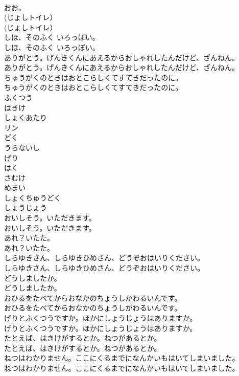 \documentclass[8pt]{extreport}
\begin{document}
\begin{CJK}{UTF8}{min}
\\	おお。
\\	(じょしトイレ）
\\	(じょしトイレ）
\\	しほ、そのふく いろっぽい。
\\	しほ、そのふく いろっぽい。
\\	ありがとう。げんきくんにあえるからおしゃれしたんだけど、ざんねん。
\\	ありがとう。げんきくんにあえるからおしゃれしたんだけど、ざんねん。
\\	ちゅうがくのときはおとこらしくてすてきだったのに。
\\	ちゅうがくのときはおとこらしくてすてきだったのに。
\\	ふくつう
\\	はきけ
\\	しょくあたり
\\	リン
\\	どく
\\	うらないし
\\	げり
\\	はく
\\	さむけ
\\	めまい
\\	しょくちゅうどく
\\	しょうじょう
\\	おいしそう。いただきます。
\\	おいしそう。いただきます。
\\	あれ？いたた。
\\	あれ？いたた。
\\	しらゆきさん、しらゆきひめさん、どうぞおはいりください。
\\	しらゆきさん、しらゆきひめさん、どうぞおはいりください。
\\	どうしましたか。
\\	どうしましたか。
\\	おひるをたべてからおなかのちょうしがわるいんです。
\\	おひるをたべてからおなかのちょうしがわるいんです。
\\	げりとふくつうですか。ほかにしょうじょうはありますか。
\\	げりとふくつうですか。ほかにしょうじょうはありますか。
\\	たとえば、はきけがするとか。ねつがあるとか。
\\	たとえば、はきけがするとか。ねつがあるとか。
\\	ねつはわかりません。ここにくるまでになんかいもはいてしまいました。
\\	ねつはわかりません。ここにくるまでになんかいもはいてしまいました。

\end{CJK}
\end{document}
